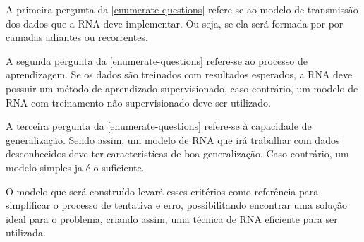 A primeira pergunta da \autoref{enumerate-questions} refere-se ao modelo de transmissão dos dados que a RNA deve implementar. Ou seja, se ela será formada por por camadas adiantes ou recorrentes.

A segunda pergunta da \autoref{enumerate-questions} refere-se ao processo de aprendizagem. Se os dados são treinados com resultados esperados, a RNA deve possuir um método de aprendizado supervisionado, caso contrário, um modelo de RNA com treinamento não supervisionado deve ser utilizado.

A terceira pergunta da \autoref{enumerate-questions} refere-se à capacidade de generalização. Sendo assim, um modelo de RNA que irá trabalhar com dados desconhecidos deve ter caracteristícas de boa generalização. Caso contrário, um modelo simples ja é o suficiente.

O modelo que será construído levará esses critérios como referência para simplificar o processo de tentativa e erro, possibilitando encontrar uma solução ideal para o problema, criando assim, uma técnica de RNA eficiente para ser utilizada.

